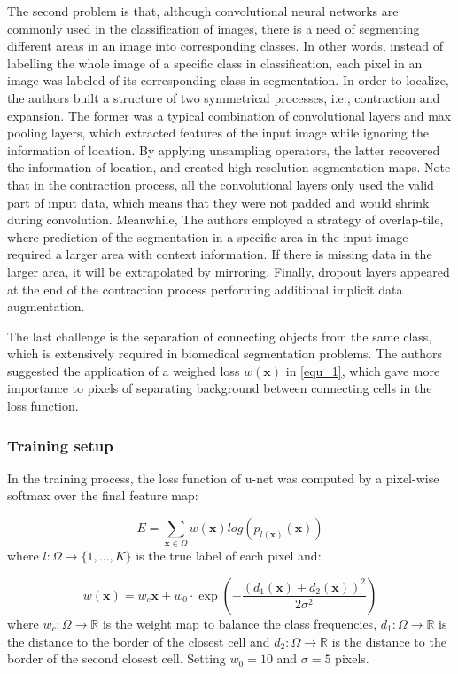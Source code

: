 \documentclass{article}
\begin{document}
The second problem is that, although convolutional neural networks are commonly used in the classification of images, there is a need of segmenting different areas in an image into corresponding classes. In other words, instead of labelling the whole image of a specific class in classification, each pixel in an image was labeled of its corresponding class in segmentation. In order to localize, the authors built a structure of two symmetrical processes, i.e., contraction and expansion. The former was a typical combination of convolutional layers and max pooling layers, which extracted features of the input image while ignoring the information of location. By applying unsampling operators, the latter recovered the information of location, and created high-resolution segmentation maps. Note that in the contraction process, all the convolutional layers only used the valid part of input data, which means that they were not padded and would shrink during convolution. Meanwhile, The authors employed a strategy of overlap-tile, where prediction of the segmentation in a specific area in the input image required a larger area with context information. If there is missing data in the larger area, it will be extrapolated by mirroring. Finally, dropout layers appeared at the end of the contraction process performing additional implicit data augmentation.

The last challenge is the separation of connecting objects from the same class, which is extensively required in biomedical segmentation problems. The authors suggested the application of a weighed loss $w(\bm{x})$ in \ref{equ_1}, which gave more importance to pixels of separating background between connecting cells in the loss function.

\subsubsection{Training setup}
In the training process, the loss function of u-net was computed by a pixel-wise softmax over the final feature map:

\begin{equation}
E = \sum_{\bm{x} \in \Omega} w(\bm{x})log(p_{l(\bm{x})}(\bm{x}))
\label{equ_1}
\end{equation}
where $l: \Omega \to \{1, \dots, K\}$ is the true label of each pixel and:

\begin{equation}
w(\bm{x}) = w_c{\bm{x}} + w_0 \cdot \exp ( - \frac{(d_1(\bm{x}) + d_2(\bm{x}))^2}{2 \sigma ^2})
\end{equation}
where $w_c : \Omega \to \mathbb{R}$ is the weight map to balance the class frequencies, $d_1 : \Omega \to \mathbb{R}$ is the distance to the border of the closest cell and $d_2 : \Omega \to \mathbb{R}$ is the distance to the border of the second closest cell. Setting $w_0 = 10$ and $\sigma = 5$ pixels.
\end{document}
